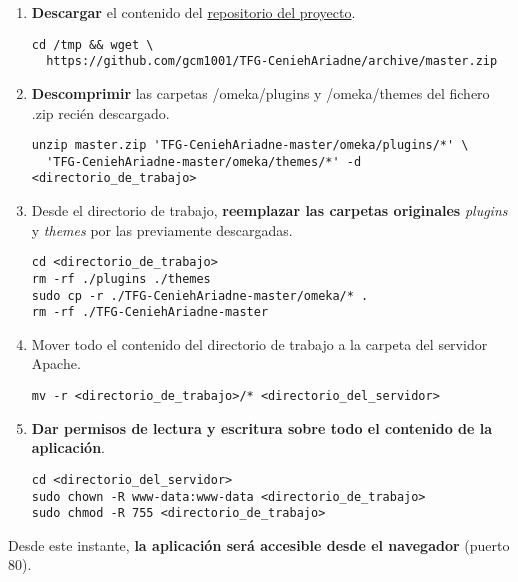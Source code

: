 \begin{enumerate}
{  datos} (anotados en el paso 1).
\begin{verbatim}
cd <directorio_de_trabajo>
nano db.ini
\end{verbatim}
  No es necesario modificar los parámetros `prefix` o `port`.
\begin{verbatim}
[database]
host     = "localhost"
username = "usuario"
password = "contraseña"
dbname   = "omekadb"
prefix   = "omeka_"
charset  = "utf8"
;port     = ""
\end{verbatim}
\item
  \textbf{Descargar} el contenido del
  \href{https://github.com/gcm1001/TFG-CeniehAriadne}{repositorio del
  proyecto}.
\begin{verbatim}
cd /tmp && wget \
  https://github.com/gcm1001/TFG-CeniehAriadne/archive/master.zip
\end{verbatim}
\item
  \textbf{Descomprimir} las carpetas {/omeka/plugins} y {/omeka/themes}
  del fichero {.zip} recién descargado.
\begin{verbatim}
unzip master.zip 'TFG-CeniehAriadne-master/omeka/plugins/*' \
  'TFG-CeniehAriadne-master/omeka/themes/*' -d <directorio_de_trabajo>
\end{verbatim}
\item
  Desde el directorio de trabajo, \textbf{reemplazar las carpetas
  originales} \emph{plugins} y \emph{themes} por las previamente
  descargadas.
\begin{verbatim}
cd <directorio_de_trabajo>
rm -rf ./plugins ./themes
sudo cp -r ./TFG-CeniehAriadne-master/omeka/* .
rm -rf ./TFG-CeniehAriadne-master
\end{verbatim}
\item
  Mover todo el contenido del directorio de trabajo a la carpeta del
  servidor Apache.
\begin{verbatim}
mv -r <directorio_de_trabajo>/* <directorio_del_servidor>
\end{verbatim}
\item
  \textbf{Dar permisos de lectura y escritura sobre todo el contenido de
  la aplicación}.
\begin{verbatim}
cd <directorio_del_servidor>
sudo chown -R www-data:www-data <directorio_de_trabajo>
sudo chmod -R 755 <directorio_de_trabajo>
\end{verbatim}
\end{enumerate}

Desde este instante, \textbf{la aplicación será accesible desde el
navegador} (puerto 80).

